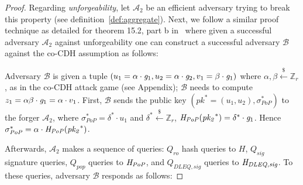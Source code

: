 \begin{proof}
\noindent Regarding \emph{unforgeability}, let $\mathcal{A}_2$ be an efficient adversary trying to break this property 
(see definition~\ref{def:aggregate}). %
Next, we follow a similar proof technique as detailed for theorem 15.2, part b in~\cite{dabo_book} where given a successful adversary 
$\mathcal{A}_2$ against unforgeability one can construct a successful adversary $\mathcal{B}$ against the co-CDH assumption as follows:

Adversary $\mathcal{B}$ is given a tuple $(u_1 = \alpha \cdot \mathit{g}_{1}, u_2 = \alpha \cdot \mathit{g}_{2}, v_1 = \beta \cdot \mathit{g}_{1})$ 
where $\alpha,\beta \xleftarrow{\$} \mathbb{Z}_{r}$, as in the co-CDH attack game (see Appendix); $\mathcal{B}$ needs to compute 
$ z_1 = \alpha\beta \cdot \mathit{g}_{1} = \alpha \cdot v_1$. 
First, $\mathcal{B}$ sends the public key $(\mathit{pk}^* = (u_1, u_2), \sigma^{*}_{\mathit{PoP}})$ to the forger 
$\mathcal{A}_2$, where $\sigma^{*}_{\mathit{PoP}} = \delta^* \cdot u_1$ and 
$\delta^* \xleftarrow{\$} \mathbb{Z}_r$, $\mathit{H}_{\mathit{PoP}}(\mathit{pk_2}^*) = \delta^* \cdot \mathit{g}_{1}$. 
Hence $\sigma^{*}_{\mathit{PoP}} =  \alpha \cdot \mathit{H}_{\mathit{PoP}}(\mathit{pk_2}^*)$.  

Afterwards, $\mathcal{A}_2$ makes a sequence of queries: $Q_{\mathit{ro}}$ hash queries to $H$, $Q_{\mathit{sig}}$ signature queries, 
$Q_{\mathit{pop}}$ queries to $\mathit{H}_{\mathit{PoP}}$, %
and $Q_{\mathit{DLEQ},\mathit{sig}}$ queries to $\mathit{H}_{\mathit{DLEQ}, \mathit{sig}}$. To these queries, 
adversary $\mathcal{B}$ responds as follows:


\end{proof}
